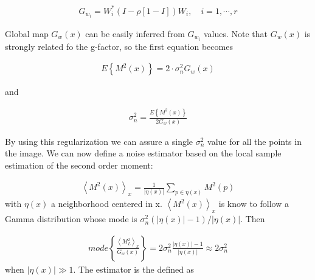 \begin{equation}
\begin{aligned}
G_{w_i}=W_i^{*}\left ( I-\rho\left [ 1-I \right ] \right )W_i, \quad i=1,\cdots ,r
\end{aligned}
\end{equation}

Global map $G_w(x)$ can be easily inferred from $G_{w_i}$ values. Note that $G_w(x)$ is strongly related fo the g-factor, so the first equation becomes

\begin{equation}
\begin{aligned}
E\left \{ M^{2}\left ( x \right ) \right \}= 2\cdot \sigma_n^{2}G_w \left ( x \right )
\end{aligned}
\end{equation}

and

\begin{equation}
\begin{aligned}
\sigma_n^{2}=\frac{E\left \{ M^{2}\left ( x \right ) \right \}}{2G_w \left ( x \right )}
\end{aligned}
\end{equation}

By using this regularization we can assure a single $\sigma_n^{2}$ value for all the points in the image. We can now define a noise estimator based on the local sample estimation of the second order moment:

\begin{equation}
\begin{aligned}
\left \langle M^2(x) \right \rangle_x= \frac{1}{\left | \eta(x) \right |}\sum_{p \in \eta(x)}M^2(p)
\end{aligned}
\end{equation}
with $\eta(x)$ a neighborhood centered in x. $\left \langle M^2(x) \right \rangle_x$ is know to follow a Gamma distribution whose mode is $\sigma_n^{2}(\left | \eta(x) \right |-1)/\left | \eta(x) \right |$. Then

\begin{equation}
\begin{aligned}
mode\left \{ \frac{\left \langle M_L^2 \right \rangle_x}{G_w(x)} \right \}=2\sigma_n^2\frac{\left | \eta(x) \right |-1}{\left | \eta(x) \right |}\approx 2\sigma_n^2
\end{aligned}
\end{equation}
when $\left | \eta(x) \right |\gg 1$. The estimator is the defined as

